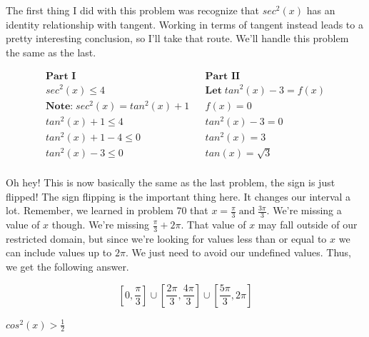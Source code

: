 \documentclass[10pt,letterpaper]{amspset}
\begin{document}
\begin{solution}
    The first thing I did with this problem was recognize that $sec^2(x)$ has an identity relationship with tangent. Working in terms of tangent instead leads to a pretty interesting conclusion, so I'll take that route. We'll handle this problem the same as the last.
    
    \begin{align}
        \textbf{Part I} && \textbf{Part II} \\
        sec^2(x) \leq 4 &&  \textbf{Let} \; tan^2(x) - 3 = f(x) \\
        \textbf{Note:} \; sec^2(x) = tan^2(x) + 1 &&  f(x) = 0 \\
         tan^2(x) + 1 \leq 4 &&  tan^2(x) - 3 = 0 \\
        tan^2(x) + 1 - 4 \leq 0 &&  tan^2(x) = 3 \\
        tan^2(x) - 3 \leq 0 &&  tan(x) = \sqrt{3} \\
    \end{align}
    
    Oh hey! This is now basically the same as the last problem, the sign is just flipped! The sign flipping is the important thing here. It changes our interval a lot. Remember, we learned in problem 70 that \linebreak $x = \frac{\pi}{3} \; \text{and} \; \frac{3\pi}{3}$. We're missing a value of $x$ though. We're missing $\frac{\pi}{3} + 2\pi$. That value of $x$ may fall outside of our restricted domain, but since we're looking for values less than or equal to $x$ we can include values up to $2\pi$. We just need to avoid our undefined values. Thus, we get the following answer.
    
    \[ \boxed{ \left[ 0, \frac{\pi}{3} \right] \cup \left[ \frac{2\pi}{3}, \frac{4\pi}{3} \right] \cup \left[ \frac{5\pi}{3}, 2\pi \right]  }\]
\end{solution}


\pagebreak


\begin{problem}[72]
    $cos^2(x) > \frac{1}{2}$
\end{problem}
\end{document}
